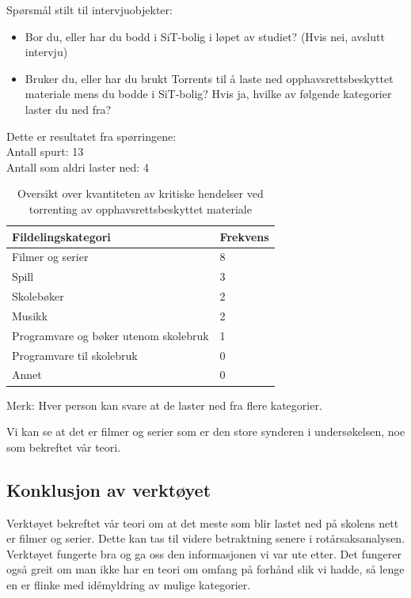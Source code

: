 Spørsmål stilt til intervjuobjekter:
\begin{itemize}
    \item Bor du, eller har du bodd i SiT-bolig i løpet av studiet? (Hvis nei, avslutt intervju)
    \item Bruker du, eller har du brukt Torrents til å laste ned opphavsrettsbeskyttet materiale mens du bodde i SiT-bolig? Hvis ja, hvilke av følgende kategorier laster du ned fra?
\end{itemize}

\noindent Dette er resultatet fra spørringene: \\
\indent Antall spurt: 13 \\
\indent Antall som aldri laster ned: 4
\begin{table} [H]
    \begin{tabular}{ | m{20em} | m{20em} | }
        \hline
            \cellcolor{yellow} Fildelingskategori & \cellcolor{yellow} Frekvens \\
        \hline
            Filmer og serier & 8  \\
        \hline
            Spill & 3 \\
        \hline
            Skolebøker & 2 \\
        \hline
            Musikk & 2 \\
        \hline
            Programvare og bøker utenom skolebruk & 1 \\
        \hline
            Programvare til skolebruk & 0 \\
        \hline
            Annet & 0 \\
        \hline
    \end{tabular}
    \caption{Oversikt over kvantiteten av kritiske hendelser ved torrenting av opphavsrettsbeskyttet materiale}
    \label{kritisk_tabell_1}
\end{table}

Merk: Hver person kan svare at de laster ned fra flere kategorier.

\noindent Vi kan se at det er filmer og serier som er den store synderen i undersøkelsen, noe som bekreftet vår teori. 

\subsection{Konklusjon av verktøyet}
Verktøyet bekreftet vår teori om at det meste som blir lastet ned på skolens nett er filmer og serier. Dette kan tas til videre betraktning senere i rotårsaksanalysen. Verktøyet fungerte bra og ga oss den informasjonen vi var ute etter. Det fungerer også greit om man ikke har en teori om omfang på forhånd slik vi hadde, så lenge en er flinke med idémyldring av mulige kategorier. 